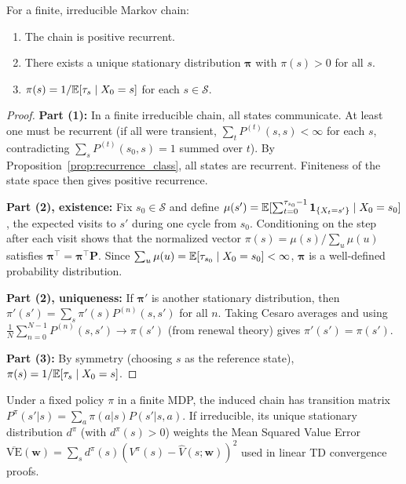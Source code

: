 \documentclass[11pt,a4paper]{article}
\begin{document}
\begin{keyresult}[title={Stationary Distribution Theorem}]
\begin{theorem}
\label{thm:stationary_existence}
For a finite, irreducible Markov chain:
\begin{enumerate}[nosep]
  \item The chain is positive recurrent.
  \item There exists a unique stationary distribution
    $\boldsymbol{\pi}$ with $\pi(s) > 0$ for all $s$.
  \item $\pi(s) = 1/\mathbb{E}[\tau_s \mid X_0 = s]$ for each
    $s \in \mathcal{S}$.
\end{enumerate}
\end{theorem}
\end{keyresult}

\begin{proof}
\textbf{Part (1):}
In a finite irreducible chain, all states communicate.  At least
one must be recurrent (if all were transient,
$\sum_t P^{(t)}(s, s) < \infty$ for each $s$, contradicting
$\sum_s P^{(t)}(s_0, s) = 1$ summed over $t$).  By
Proposition~\ref{prop:recurrence_class}, all states are recurrent.
Finiteness of the state space then gives positive recurrence.

\textbf{Part (2), existence:}
Fix $s_0 \in \mathcal{S}$ and define
$\mu(s') = \mathbb{E}[\sum_{t=0}^{\tau_{s_0} - 1}
\mathbf{1}_{\{X_t = s'\}} \mid X_0 = s_0]$,
the expected visits to $s'$ during one cycle from $s_0$.
Conditioning on the step after each visit shows that the
normalized vector $\pi(s) = \mu(s)/\sum_u \mu(u)$ satisfies
$\boldsymbol{\pi}^\top = \boldsymbol{\pi}^\top \mathbf{P}$.
Since $\sum_u \mu(u) = \mathbb{E}[\tau_{s_0} \mid X_0 = s_0] < \infty$,
$\boldsymbol{\pi}$ is a well-defined probability distribution.

\textbf{Part (2), uniqueness:}
If $\boldsymbol{\pi}'$ is another stationary distribution, then
$\pi'(s') = \sum_s \pi'(s) P^{(n)}(s, s')$ for all $n$.
Taking Cesaro averages and using
$\frac{1}{N}\sum_{n=0}^{N-1} P^{(n)}(s, s') \to \pi(s')$
(from renewal theory) gives $\pi'(s') = \pi(s')$.

\textbf{Part (3):}
By symmetry (choosing $s$ as the reference state),
$\pi(s) = 1/\mathbb{E}[\tau_s \mid X_0 = s]$.
\end{proof}

\begin{rlconnection}[title={Stationary Distribution in Policy Evaluation}]
Under a fixed policy $\pi$ in a finite MDP, the induced chain
has transition matrix $P^\pi(s'|s) = \sum_a \pi(a|s) P(s'|s,a)$.
If irreducible, its unique stationary distribution $d^\pi$
(with $d^\pi(s) > 0$) weights the Mean Squared Value Error
$\overline{\text{VE}}(\mathbf{w}) = \sum_s d^\pi(s)
(V^\pi(s) - \hat{V}(s;\mathbf{w}))^2$ used in linear TD
convergence proofs.
\end{rlconnection}
\end{document}
